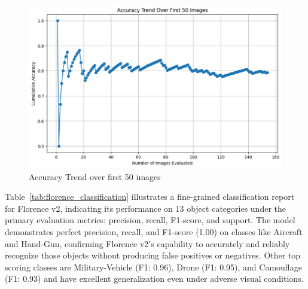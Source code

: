 \documentclass[fleqn,10pt,lineno]{wlpeerj}
\begin{document}
\begin{figure} [H]
    \centering
    \includegraphics[width=1\linewidth]{accuracy.png}
    \caption{Accuracy Trend over first 50 images}
    \label{fig:accuracy-50img}
\end{figure}

Table~\ref{tab:florence_classification} illustrates a fine-grained classification report for Florence v2, indicating its performance on 13 object categories under the primary evaluation metrics: precision, recall, F1-score, and support. The model demonstrates perfect precision, recall, and F1-score (1.00) on classes like Aircraft and Hand-Gun, confirming Florence v2's capability to accurately and reliably recognize those objects without producing false positives or negatives. Other top scoring classes are Military-Vehicle (F1: 0.96), Drone (F1: 0.95), and Camouflage (F1: 0.93) and have excellent generalization even under adverse visual conditions.
\end{document}
